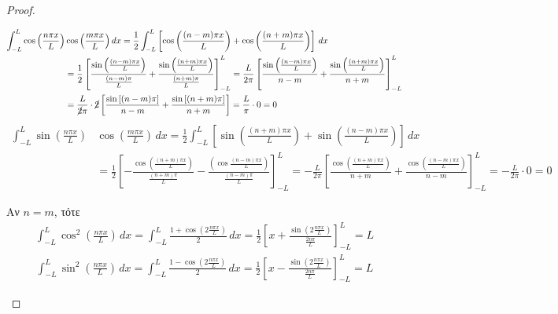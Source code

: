 \begin{proof}
\begin{myitemize}
\begin{align*}
        \int _{-L}^{L} \cos{\left(\frac{n \pi x }{L}\right)} 
        &\cos{\left(\frac{m \pi x}{L}\right)} \,{dx} 
        = \frac{1}{2} \int _{-L}^{L} \left[\cos{\left(\frac{(n-m) \pi x}{L}\right)} 
        + \cos{\left(\frac{(n+m) \pi x}{L}\right)} \right] \,{dx} \\
        &= \frac{1}{2} \left[\frac{\sin{\left(\frac{(n-m) \pi x}{L}\right)}}
          {\frac{(n-m) \pi}{L}} + \frac{\sin{\left(\frac{(n+m) \pi x}{L}\right)}}
        {\frac{(n+m) \pi }{L}}\right]_{-L}^{L} 
        = \frac{L}{2 \pi} \left[\frac{\sin{\left(\frac{(n-m) \pi
          x}{L}\right)}}{n-m} + 
        \frac{\sin{\left(\frac{(n+m) \pi x}{L}\right)}}{n+m}\right]_{-L}^{L} \\ 
        &= \frac{L}{\cancel{2}\pi} \cdot \cancel{2}
        \left[ \frac{\sin{[(n-m) \pi]}}{n-m} + \frac{\sin{[(n+m)
        \pi]}}{n+m}\right] = \frac{L}{\pi} \cdot 0 = 0
      \end{align*}
      \begin{align*}
        \int _{-L}^{L} \sin{\left(\frac{n \pi x }{L}\right)} 
        &\cos{\left(\frac{m \pi x}{L}\right)} \,{dx} 
        = \frac{1}{2} \int _{-L}^{L} \left[\sin{\left(\frac{(n+m) \pi x}{L}\right)} 
        + \sin{\left(\frac{(n-m) \pi x}{L}\right)} \right] \,{dx} \\
        &= \frac{1}{2} \left[-\frac{\cos{\left(\frac{(n+m) \pi x}{L}\right)}}
          {\frac{(n+m) \pi}{L}} - \frac{\left(\cos{\frac{(n-m) \pi x}{L}}\right)}
        {\frac{(n-m) \pi }{L}}\right]_{-L}^{L}
        =-\frac{L}{2 \pi} \left[\frac{\cos{\left(\frac{(n+m) \pi x}{L}\right)}}{n+m} + 
        \frac{\cos{\left(\frac{(n-m) \pi x}{L}\right)}}{n-m}\right]_{-L}^{L} 
        = -\frac{L}{2\pi}\cdot 0 = 0
      \end{align*}
    \item Αν $ n = m $, τότε
      \begin{align*}
        \int _{-L}^{L} \cos^{2}\left(\frac{n \pi x}{L}\right) \,{dx} = 
        \int _{-L}^{L} \frac{1+ \cos{\left( 2 \frac{n \pi x}{L} \right)}}{2}
        \,{dx} = 
        \frac{1}{2} \left[x + \frac{\sin{\left(2 \frac{n \pi x}{L}\right)}}
        {\frac{2 n \pi}{L}} \right]_{-L}^{L} = L
      \end{align*}
      \begin{align*}
        \int _{-L}^{L} \sin^{2}\left(\frac{n \pi x}{L}\right) \,{dx} = 
        \int _{-L}^{L} \frac{1- \cos{\left( 2 \frac{n \pi x}{L} \right)}}{2}
        \,{dx} = 
        \frac{1}{2} \left[x - \frac{\sin{\left(2 \frac{n \pi x}{L}\right)}}
        {\frac{2 n \pi}{L}} \right]_{-L}^{L} = L

\end{align*}
\end{myitemize}
\end{proof}
